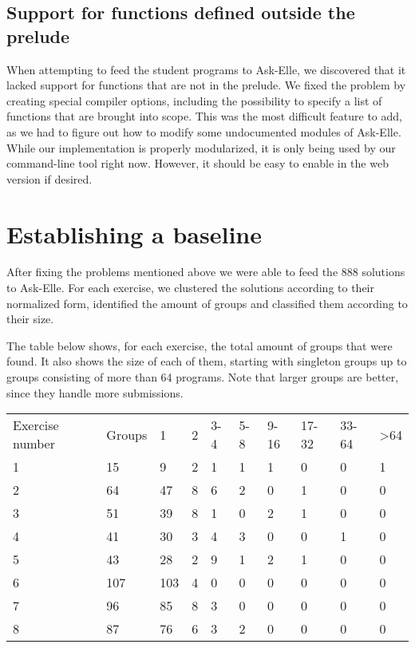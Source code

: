 \subsection{Support for functions defined outside the prelude}

When attempting to feed the student programs to Ask-Elle, we discovered that it lacked support for functions that are not in the prelude. We fixed the problem by creating special compiler options, including the possibility to specify a list of functions that are brought into scope. This was the most difficult feature to add, as we had to figure out how to modify some undocumented modules of Ask-Elle. While our implementation is properly modularized, it is only being used by our command-line tool right now. However, it should be easy to enable in the web version if desired.

\section{Establishing a baseline}

After fixing the problems mentioned above we were able to feed the 888 solutions to Ask-Elle. For each exercise, we clustered the solutions according to their normalized form, identified the amount of groups and classified them according to their size.

The table below shows, for each exercise, the total amount of groups that were found. It also shows the size of each of them, starting with singleton groups up to groups consisting of more than 64 programs. Note that larger groups are better, since they handle more submissions.

\begin{tabular}{l l l l l l l l l l}
    Exercise number & Groups & 1     & 2   & 3-4 & 5-8 & 9-16 & 17-32 & 33-64 & >64 \\
    1               & 15     &  9    &  2  &  1  &  1  &  1  &  0  &  0  &  1       \\
    2               & 64     &  47   &  8  &  6  &  2  &  0  &  1  &  0  &  0       \\
    3               & 51     &  39   &  8  &  1  &  0  &  2  &  1  &  0  &  0       \\
    4               & 41     &  30   &  3  &  4  &  3  &  0  &  0  &  1  &  0       \\
    5               & 43     &  28   &  2  &  9  &  1  &  2  &  1  &  0  &  0       \\
    6               & 107    &  103  &  4  &  0  &  0  &  0  &  0  &  0  &  0       \\
    7               & 96     &  85   &  8  &  3  &  0  &  0  &  0  &  0  &  0       \\
    8               & 87     &  76   &  6  &  3  &  2  &  0  &  0  &  0  &  0
\end{tabular}

